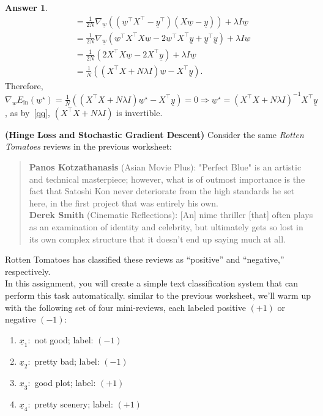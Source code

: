 \documentclass{article}
\theoremstyle{definition}
\newtheorem*{answer}{Answer}
\begin{document}
\begin{question}[start=0]
\begin{question}
\begin{answer}
\begin{align*}
					&= \frac{1}{2N} \nabla_{\!\underline{w}}\left((\underline{w}^\top X^\top  - \underline{y}^\top) (X \underline{w} - \underline{y})\right)+\lambda I \underline{w}\\
					&= \frac{1}{2N} \nabla_{\!\underline{w}}\left(\underline{w}^\top X^\top X \underline{w} - 2\underline{w}^\top X^\top \underline{y}  + \underline{y}^\top \underline{y}\right)+\lambda I \underline{w}\\
					&= \frac{1}{2N} \left(2 X^\top X \underline{w} - 2 X^\top \underline{y}\right)+\lambda I \underline{w}\\
					&= \frac{1}{N} \left((X^\top X + N \lambda I) \underline{w} - X^\top \underline{y}\right).
				\end{align*}
				Therefore, $\nabla_{\!\underline{w}}E_{\text{in}}(\underline{w}^\star) = \frac{1}{N} \left((X^\top X + N \lambda I) \underline{w}^\star - X^\top \underline{y}\right) = 0 \Rightarrow \underline{w}^\star = (X^\top X + N \lambda I)^{-1} X^\top \underline{y}$, as by~\ref{qq}, $(X^\top X + N \lambda I)$ is invertible.
			\end{answer}
		\end{question}
		\item \textbf{(Hinge Loss and Stochastic Gradient Descent)} Consider the same \textit{Rotten Tomatoes} reviews in the previous worksheet:
		\begin{quote}
			\textbf{Panos Kotzathanasis} (Asian Movie Plus): "Perfect Blue" is an artistic and technical masterpiece; however, what is of outmost importance is the fact that Satoshi Kon never deteriorate from the high standards he set here, in the first project that was entirely his own.\\
			
			\textbf{Derek Smith} (Cinematic Reflections): [An] nime thriller [that] often plays as an examination of identity and celebrity, but ultimately gets so lost in its own complex structure that it doesn't end up saying much at all.
		\end{quote}
		
		Rotten Tomatoes has classified these reviews as ``positive'' and ``negative,'' respectively.\\
		
		In this assignment, you will create a simple text classification system that can perform this task automatically. similar to the previous worksheet, we'll warm up with the following set of four mini-reviews, each labeled positive $(+1)$ or negative $(-1)$:
		\begin{enumerate}
			\item $\underline{x}_1:$ not good; label: $(-1)$
			\item $\underline{x}_2:$ pretty bad; label: $(-1)$
			\item $\underline{x}_3:$ good plot; label: $(+1)$
			\item $\underline{x}_4:$ pretty scenery; label: $(+1)$
		\end{enumerate}
		

\end{question}
\end{document}
